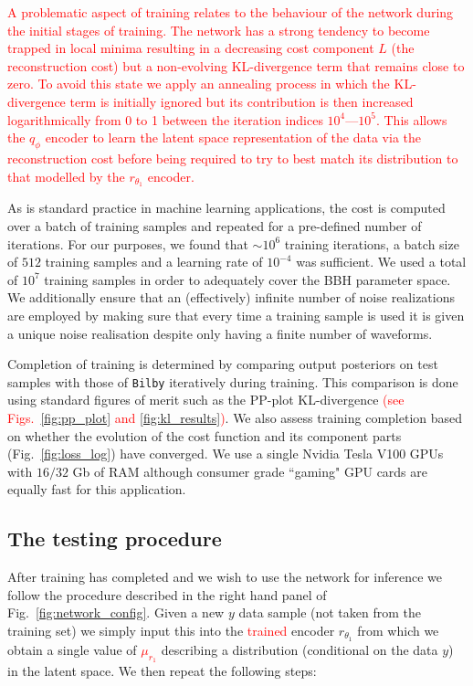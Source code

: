 \documentclass[%
showpacs,
nofootinbib,
 amsmath,amssymb,
 aps,
 twocolumn,
 prl,
 reprint,
floatfix,
]{revtex4-1}
\newcommand{\new}[1]{\textcolor{red}{#1}}
\begin{document}
%
%
\new{A problematic aspect of training relates to the behaviour of the network during
the initial stages of training. The network has a strong tendency to become
trapped in local minima resulting in a decreasing cost component $L$ (the
reconstruction cost) but a non-evolving \ac{KL}-divergence term that remains
close to zero. To avoid this state we apply an annealing process in which the
\ac{KL}-divergence term is initially ignored but its contribution is then
increased logarithmically from 0 to 1 between the iteration indices
$10^4$---$10^5$. This allows the $q_{\phi}$ encoder to learn the latent space
representation of the data via the reconstruction cost before being required to
try to best match its distribution to that modelled by the $r_{\theta_1}$
encoder.}   

%
%
As is standard practice in machine learning applications, the cost is computed
over a batch of training samples and repeated for a pre-defined number of
iterations. For our purposes, we found that $\sim 10^6$ training
iterations, a batch size of $512$ training samples and a learning rate of
$10^{-4}$ was sufficient. We used a total of $10^7$ training samples in order
to adequately cover the \ac{BBH} parameter space. We additionally ensure that
an (effectively) infinite number of noise realizations are employed by making
sure that every time a training sample is used it is given a unique noise
realisation despite only having a finite number of waveforms.

%
%
Completion of training is determined by comparing output posteriors on test
samples with those of \texttt{Bilby} iteratively during training. This
comparison is done using standard figures of merit such as the \ac{PP}-plot
\ac{KL}-divergence \new{(see Figs.~\ref{fig:pp_plot} and
\ref{fig:kl_results})}. We also assess training completion based on whether the
evolution of the cost function and its component parts
(Fig.~\ref{fig:loss_log}) have converged. We use a single Nvidia Tesla V100
\acp{GPU} with $16/32$ Gb of RAM although consumer grade ``gaming" \ac{GPU}
cards are equally fast for this application.

\subsection{The testing procedure}
%
%
After training has completed and we wish to use the network for inference we
follow the procedure described in the right hand panel of
Fig.~\ref{fig:network_config}. Given a new $y$ data sample (not taken from the
training set) we simply input this into the \new{trained} encoder $r_{\theta_1}$ from
which we obtain a single value of \new{$\mu_{r_1}$} describing a distribution
(conditional on the data $y$) in the latent space. We then repeat the following
steps:
\end{document}
